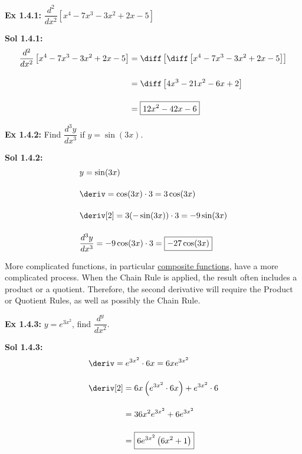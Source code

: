 \begin{tcolorbox}[example]
    \textbf{Ex 1.4.1: } $\dfrac{d^2}{dx^2} \left[x^4 - 7x^3 - 3x^2 + 2x - 5\right]$
\end{tcolorbox}
\begin{tcolorbox}[solution]
    \textbf{Sol 1.4.1: } \begin{align*}
        \dfrac{d^2}{dx^2} \left[x^4 - 7x^3 - 3x^2 + 2x - 5\right] &= \diff \left[\diff \left[x^4 - 7x^3 - 3x^2 + 2x - 5\right]\right] \\[11pt]
        & = \diff \left[4x^3 - 21x^2 - 6x + 2\right] \\[11pt]
        & = \boxed{12x^2 - 42x - 6}
    \end{align*}
\end{tcolorbox} \vspace{11pt}
 
\begin{tcolorbox}[example]
    \textbf{Ex 1.4.2: } Find $\dfrac{d^3y}{dx^3}$ if $y = \sin (3x)$.
\end{tcolorbox} 
\begin{tcolorbox}[solution]
    \textbf{Sol 1.4.2: } \begin{align*}
        & y = \sin (3x) \\[11pt]
        & \deriv = \cos (3x) \cdot 3 = 3\cos (3x) \\[11pt]
        & \deriv[2] = 3(-\sin (3x)) \cdot 3 = -9\sin (3x) \\[11pt]
        & \dfrac{d^3y}{dx^3} = -9\cos (3x) \cdot 3 = \boxed{-27\cos (3x)}
    \end{align*}
\end{tcolorbox}

More complicated functions, in particular \hyperlink{Composite Function}{composite functions}, have a more complicated process. When the Chain Rule is applied, the result often includes a product or a quotient. Therefore, the second derivative will require the Product or Quotient Rules, as well as possibly the Chain Rule. \par

\begin{tcolorbox}[example]
    \textbf{Ex 1.4.3: } $y = e^{3x^2}$, find $\dfrac{d^y}{dx^2}$. 
\end{tcolorbox}
\begin{tcolorbox}[solution]
    \textbf{Sol 1.4.3: }\begin{align*}
        & \deriv = e^{3x^2} \cdot 6x = 6xe^{3x^2} \\[11pt]
        & \deriv[2] \begin{aligned}[t]
            & = 6x\left(e^{3x^2} \cdot 6x\right) + e^{3x^2} \cdot 6 \\[11pt]
            & = 36x^2e^{3x^2} + 6e^{3x^2} \\[11pt]
            & = \boxed{6e^{3x^2}\left(6x^2 + 1\right)}
        \end{aligned}
    \end{align*}
\end{tcolorbox} \vspace{11pt}

